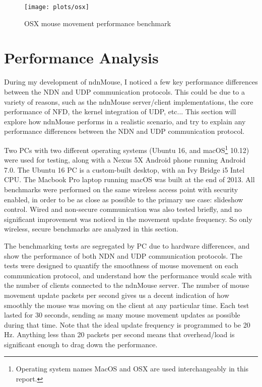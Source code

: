 \documentclass{sig-alternate}
\renewcommand\_{\textunderscore\allowbreak}  %
\begin{document}
\begin{figure}[t]
	\centering
	\hypertarget{fig:osxBenchmark}{}
	\texttt{[image: plots/osx]}
	\caption{OSX mouse movement performance benchmark}
\end{figure}

\section{Performance Analysis}
\label{sec:performance}
During my development of ndnMouse, I noticed a few key performance differences between the NDN and UDP communication protocols. This could be due to a variety of reasons, such as the ndnMouse server/client implementations, the core performance of NFD, the kernel integration of UDP, etc... This section will explore how ndnMouse performs in a realistic scenario, and try to explain any performance differences between the NDN and UDP communication protocol.

Two PCs with two different operating systems (Ubuntu 16, and macOS\footnote{Operating system names MacOS and OSX are used interchangeably in this report.} 10.12) were used for testing, along with a Nexus 5X Android phone running Android 7.0. The Ubuntu 16 PC is a custom-built desktop, with an Ivy Bridge i5 Intel CPU. The Macbook Pro laptop running macOS was built at the end of 2013. All benchmarks were performed on the same wireless access point with security enabled, in order to be as close as possible to the primary use case: slideshow control. Wired and non-secure communication was also tested briefly, and no significant improvement was noticed in the movement update frequency. So only wireless, secure benchmarks are analyzed in this section.

The benchmarking tests are segregated by PC due to hardware differences, and show the performance of both NDN and UDP communication protocols. The tests were designed to quantify the smoothness of mouse movement on each communication protocol, and understand how the performance would scale with the number of clients connected to the ndnMouse server. The number of mouse movement update packets per second gives us a decent indication of how smoothly the mouse was moving on the client at any particular time. Each test lasted for 30 seconds, sending as many mouse movement updates as possible during that time. Note that the ideal update frequency is programmed to be 20 Hz. Anything less than 20 packets per second means that overhead/load is significant enough to drag down the performance. 
\end{document}
